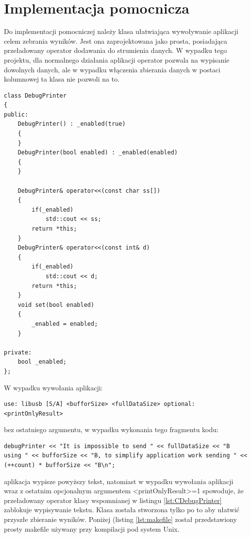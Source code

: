 \documentclass{BscUS}
\begin{document}
\section{Implementacja pomocnicza}
\label{sch:additionalImplementation}
Do implementacji pomocniczej należy klasa ułatwiająca wywoływanie aplikacji celem zebrania wyników. Jest ona zaprojektowana jako prosta, posiadająca przeładowany operator dodawania do strumienia danych. W wypadku tego projektu, dla normalnego działania aplikacji operator pozwala na wypisanie dowolnych danych, ale w wypadku włączenia zbierania danych w postaci kolumnowej ta klasa nie pozwoli na to.

\begin{lstlisting}[caption={Klasa DebugPrinter},label={lst:CDebugPrinter}]
class DebugPrinter
{
public:
	DebugPrinter() : _enabled(true)
	{
	}
	DebugPrinter(bool enabled) : _enabled(enabled)
	{
	}
	
	DebugPrinter& operator<<(const char ss[])
	{
		if(_enabled)
			std::cout << ss;
		return *this;
	}
	DebugPrinter& operator<<(const int& d)
	{
		if(_enabled)
			std::cout << d;
		return *this;
	}
	void set(bool enabled)
	{
		_enabled = enabled;
	}

private:
	bool _enabled;
};
\end{lstlisting}
W wypadku wywołania aplikacji:
\begin{lstlisting}[caption={Uruchomienie testu}]
use: libusb [S/A] <bufforSize> <fullDataSize> optional:<printOnlyResult>
\end{lstlisting}
bez ostatniego argumentu, w wypadku wykonania tego fragmentu kodu: 
\begin{lstlisting}[caption={Wypisywanie w zależności od argumentu wywołania aplikacji}]
debugPrinter << "It is impossible to send " << fullDataSize << "B using " << bufforSize << "B, to simplify application work sending " << (++count) * bufforSize << "B\n";
\end{lstlisting}
aplikacja wypisze powyższy tekst, natomiast w wypadku wywołania aplikacji wraz z ostatnim opcjonalnym argumentem <printOnlyResult>=1 spowoduje, że przeładowany operator klasy wspomnianej w listingu \ref{lst:CDebugPrinter} zablokuje wypisywanie tekstu.
Klasa została stworzona tylko po to aby ułatwić przyszłe zbieranie wyników.
\newline
\newline
Poniżej (listing \ref{lst:makefile} został przedstawiony prosty makefile używany przy kompilacji pod system Unix.
\end{document}
